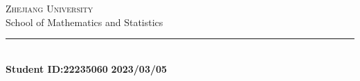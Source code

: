 
\thispagestyle{empty} %

	\noindent %
	\begin{minipage}[b]{1\textwidth}
		\centering
		{\Large {\textsc{Zhejiang University}}}\\
		\vspace{0.4 em}
		{\large {School of Mathematics and Statistics}}
		\vspace{0.6 em}
	\end{minipage}%
	
	\vspace{5 em}

	\begin{center}
		
		{\large {\textsc{\esame}}} %
		\vspace{8 em}
		
		{\Huge {\titolo}} %
		\vspace{10 em}
		
		\vspace{6 em}
		\vfill
		
	    {\rule{380pt}{.4pt}}\\
		\vspace{1.2 em}
		\large{\textbf{Student ID:22235060}}
		\qquad
		\large{\textbf{2023/03/05}} %
		
		
		
		
	\end{center}

